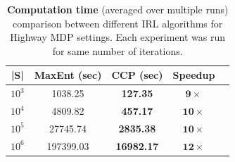 \documentclass{article}
\def\MSHangBox#1{%
\begin{minipage}[t]{\textwidth}%
\begin{tabbing} %
~\\[-\baselineskip] %
#1 %
\end{tabbing}%
\end{minipage}} %
\begin{document}
\begin{table}[t]
\centering
\def\arraystretch{1.3}%
\begin{tabular}{|c|c|c|c|c|}
\hline
|S| & MaxEnt (sec) & CCP (sec) & Speedup \\\hline
$10^3$ & 1038.25 & \textbf{127.35}  &  $\mathbf{9}\times$ \\
$10^4$ & 4809.82 & \textbf{457.17} & $\mathbf{10}\times$ \\
$10^5$ & 27745.74 & \textbf{2835.38} & $\mathbf{10}\times$ \\
$10^6$ & 197399.03 & \textbf{16982.17} & $\mathbf{12}\times$ \\
\hline
\end{tabular}
\caption{\textbf{Computation time} (averaged over multiple runs) comparison between different IRL algorithms for Highway MDP settings. Each experiment was run for same number of iterations.
}
\label{table:table_results_macro_cells}
\end{table}

\end{document}
